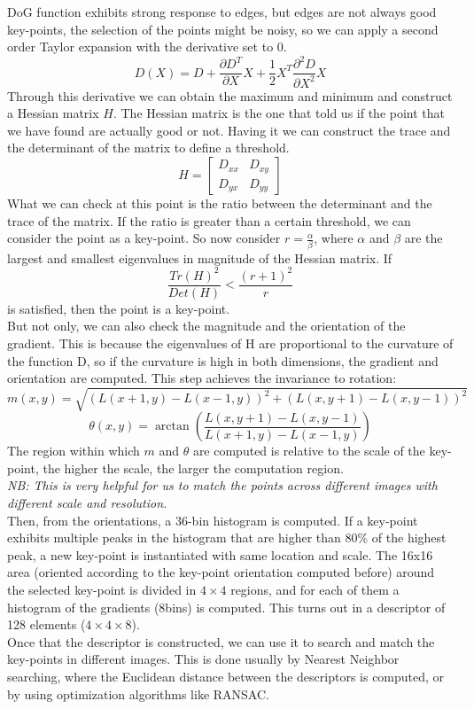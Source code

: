 DoG function exhibits strong response to edges, but edges are not always good key-points, the selection of the points might be noisy, so we can apply a second order Taylor expansion with the derivative set to $0$. 
\[
    D(X)=D + \frac{\partial D^T}{\partial X}X + \frac{1}{2}X^T\frac{\partial^2D}{\partial X^2}X
\]
Through this derivative we can obtain the maximum and minimum and construct a Hessian matrix $H$.
The Hessian matrix is the one that told us if the point that we have found are actually good or not.
Having it we can construct the trace and the determinant of the matrix to define a threshold.
\[
    H = \begin{bmatrix}
        D_{xx} & D_{xy} \\
        D_{yx} & D_{yy}
    \end{bmatrix}
\]
What we can check at this point is the ratio between the determinant and the trace of the matrix.
If the ratio is greater than a certain threshold, we can consider the point as a key-point.
So now consider $r = \frac{\alpha}{\beta}$, where $\alpha$ and $\beta$ are the largest and smallest eigenvalues in magnitude of the Hessian matrix.
If \[ \frac{Tr(H)^2}{Det(H)} < \frac{(r+1)^2}{r} \] is satisfied, then the point is a key-point.
\\
But not only, we can also check the magnitude and the orientation of the gradient.
This is because the eigenvalues of H are proportional to the curvature of the function D, so if the curvature is high in both dimensions, the gradient and orientation are computed.
This step achieves the invariance to rotation:
\[
    m(x,y) = \sqrt{(L(x+1,y)-L(x-1,y))^2 + (L(x,y+1)-L(x,y-1))^2}  
\]
\[
    \theta(x,y) = \arctan\left(\frac{L(x,y+1)-L(x,y-1)}{L(x+1,y)-L(x-1,y)}\right)
\]
The region within which $m$ and $\theta$ are computed is relative to the scale of the key-point, the higher the scale, the larger the computation region.
\\\textit{NB: This is very helpful for us to match the points across different images with different scale and resolution.}
\\
Then, from the orientations, a 36-bin histogram is computed. If a key-point exhibits multiple peaks in the histogram that are higher than $80\%$ of the highest peak, a new key-point is instantiated with same location and scale.
The 16x16 area (oriented according to the key-point orientation computed before) around the selected key-point is divided in $4\times4$ regions, and for each of them a histogram of the gradients (8bins) is computed.
This turns out in a descriptor of 128 elements ($4\times4\times8$).
\\
Once that the descriptor is constructed, we can use it to search and match the key-points in different images. This is done usually by Nearest Neighbor searching, where the Euclidean distance between the descriptors is computed, or by using optimization algorithms like RANSAC. 